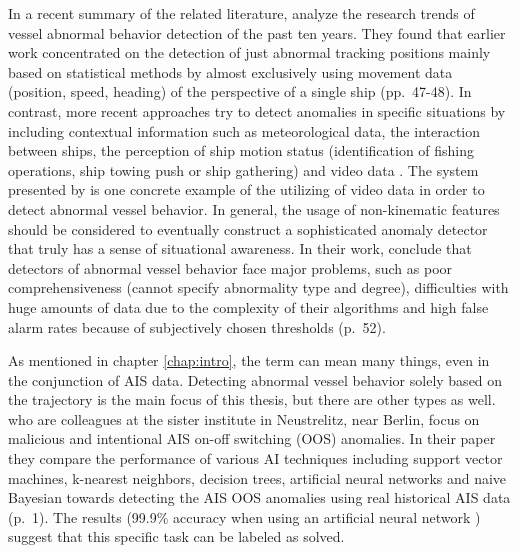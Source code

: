 \par 
In a recent summary of the related literature, \cite{zhang2020analysis} analyze the research trends of vessel abnormal behavior detection of the past ten years. They found that earlier work concentrated on the detection of just abnormal tracking positions mainly based on statistical methods by almost exclusively using movement data (position, speed, heading) of the perspective of a single ship (pp.~47-48). In contrast, more recent approaches try to detect anomalies in specific situations by including contextual information such as meteorological data, the interaction between ships, the perception of ship motion status (identification of fishing operations, ship towing push or ship gathering) and video data \cite[p.~50]{zhang2020analysis}. The system presented by \cite{solano2021detection} is one concrete example of the utilizing of video data in order to detect abnormal vessel behavior. In general, the usage of non-kinematic features should be considered to eventually construct a sophisticated anomaly detector that  truly has a sense of situational awareness. In their work, \cite{zhang2020analysis} conclude that detectors of abnormal vessel behavior face major problems, such as poor comprehensiveness (cannot specify abnormality type and degree), difficulties with huge amounts of data due to the complexity of their algorithms and high false alarm rates because of subjectively chosen thresholds (p.~52).
\par 
As mentioned in chapter \ref{chap:intro}, the term  can mean many things, even in the conjunction of AIS data. Detecting abnormal vessel behavior solely based on the trajectory is the main focus of this thesis, but there are other types as well. \cite{singh2020effectiveness} who are colleagues at the sister institute in Neustrelitz, near Berlin, focus on malicious and intentional AIS on-off switching (OOS) anomalies. In their paper they compare the performance of various AI techniques including support vector machines, k-nearest neighbors, decision trees, artificial neural networks and naive Bayesian towards detecting the AIS
OOS anomalies using real historical AIS data (p.~1). The results (99.9\% accuracy when using an artificial neural network \cite[p.~7]{singh2020effectiveness}) suggest that this specific task can be labeled as solved. 


